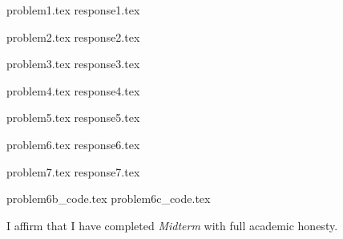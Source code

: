 \documentclass[letterpaper, 12pt]{article}
\begin{document}

% 
{problem1.tex}
{response1.tex}

% 
{problem2.tex}
{response2.tex}

% 
{problem3.tex}
{response3.tex}

% 
{problem4.tex}
{response4.tex}

% 
{problem5.tex}
{response5.tex}

{problem6.tex}
{response6.tex}

% 
{problem7.tex}
{response7.tex}

\appendix

{problem6b_code.tex}
{problem6c_code.tex}

\par

I affirm that I have completed \textit{Midterm} with full academic honesty.
\end{document}
